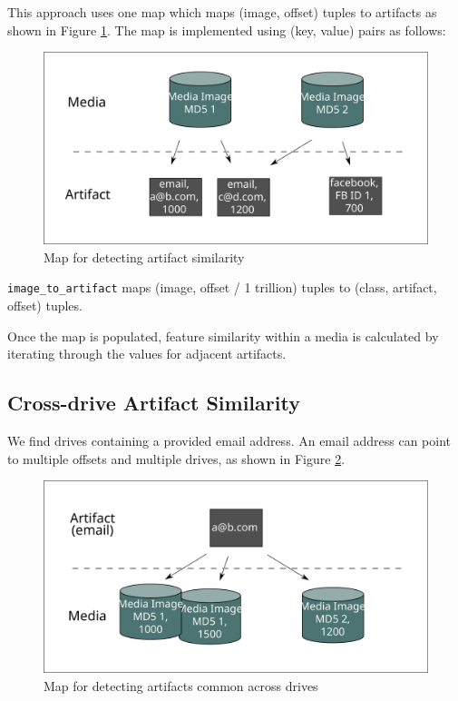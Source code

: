 \documentclass[12pt,twoside]{article}
\begin{document}
This approach uses one map which maps (image, offset) tuples to artifacts as shown in Figure \ref{fig:offsetSimilarity}. The map is implemented using (key, value) pairs as follows:

\begin{figure}
	\center
	\includegraphics[scale=.45]{offset_similarity}
	\caption{Map for detecting artifact similarity}
	\label{fig:offsetSimilarity}
\end{figure}

\begin{compactitem}
\item \verb+image_to_artifact+ maps (image, offset / 1 trillion) tuples to (class, artifact, offset) tuples.
\end{compactitem}

Once the map is populated, feature similarity within a media is calculated by iterating through the values for adjacent artifacts.

\subsection{Cross-drive Artifact Similarity}
We find drives containing a provided email address. An email address can point to multiple offsets and multiple drives, as shown in Figure \ref{fig:artifactSimilarity}.

\begin{figure}
	\center
	\includegraphics[scale=.45]{artifact_similarity}
	\caption{Map for detecting artifacts common across drives}
	\label{fig:artifactSimilarity}
\end{figure}
\end{document}
